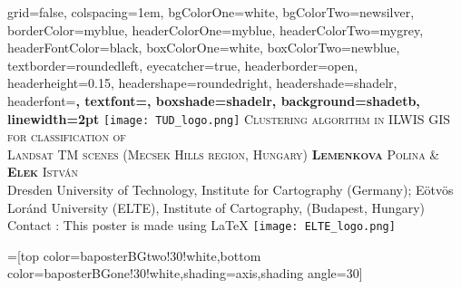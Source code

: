 \documentclass[a0paper,landscape,final]{baposter}
\begin{document}
\begin{poster}{
 	 grid=false,
  	colspacing=1em,
 	bgColorOne=white,%
  	bgColorTwo=newsilver,%
 	borderColor=myblue,%
  	headerColorOne=myblue,%
  	headerColorTwo=mygrey,%
  	headerFontColor=black,
  	boxColorOne=white,
  	boxColorTwo=newblue,
  	textborder=roundedleft,
  	eyecatcher=true,
  	headerborder=open,
  	headerheight=0.15\textheight,
  	headershape=roundedright,
  	headershade=shadelr,
 	headerfont=\large \bf\textsc, %
  	textfont={\setlength{\parindent}{1.5em}},
  	boxshade=shadelr, %
  	background=shadetb,
  	linewidth=2pt
  }
  {\texttt{[image: TUD\_logo.png]}} 
 {%
 \textsc{Clustering algorithm in ILWIS GIS for classification of \\ \vspace{4pt}Landsat TM scenes (Mecsek Hills region, Hungary)}}
 {\textsc{\textbf{Lemenkova} Polina\hspace{2pt}  \& \hspace{2pt} \textbf{Elek} Istv\'an}\\
  \small Dresden University of Technology, Institute for Cartography (Germany); \hspace{1em} E\"otv\"os Lor\'and University (ELTE), Institute of Cartography, (Budapest, Hungary)\\
 Contact \LARGE{\Letter}\normalsize: \color{blue}{Polina.Lemenkova@mailbox.tu-dresden.de} \hspace{3em} \color{black}This poster is made using \color{blue}\LaTeX}
     {%
    \texttt{[image: ELTE\_logo.png]}
  }

  =[top color=baposterBGtwo!30!white,bottom color=baposterBGone!30!white,shading=axis,shading angle=30]

     \newlength{\leftimgwidth}
     \setlength{\leftimgwidth}{0.78em+8.0em}


\end{poster}
\end{document}

